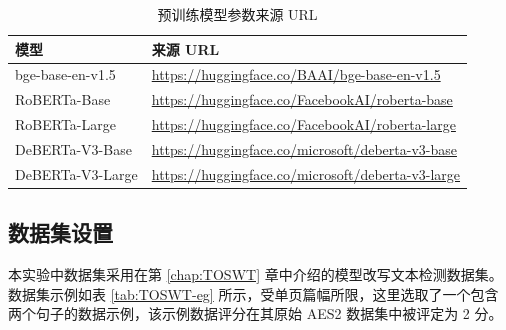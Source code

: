 \begin{table}[htbp]
\centering
\caption{预训练模型参数来源 URL} \label{tab:method-pretrain_model_url}
\begin{tabular}{ll}
\toprule
\textbf{模型}      & \textbf{来源 URL}                                                                 \\ \midrule
bge-base-en-v1.5 \cite{bge_embedding} & \url{https://huggingface.co/BAAI/bge-base-en-v1.5} \\ 
RoBERTa-Base \cite{liu_roberta_2019}     & \url{https://huggingface.co/FacebookAI/roberta-base}    \\
RoBERTa-Large \cite{liu_roberta_2019}   & \url{https://huggingface.co/FacebookAI/roberta-large}   \\
DeBERTa-V3-Base \cite{he2023debertav3improvingdebertausing}  & \url{https://huggingface.co/microsoft/deberta-v3-base}  \\
DeBERTa-V3-Large \cite{he2023debertav3improvingdebertausing} & \url{https://huggingface.co/microsoft/deberta-v3-large} \\ \bottomrule
\end{tabular}
\end{table}


\subsection{数据集设置}
\label{sec:method-experiment-dataset}

本实验中数据集采用在第 \ref{chap:TOSWT} 章中介绍的模型改写文本检测数据集。数据集示例如表 \ref{tab:TOSWT-eg} 所示，受单页篇幅所限，这里选取了一个包含两个句子的数据示例，该示例数据评分在其原始 AES2 数据集中被评定为 2 分。

